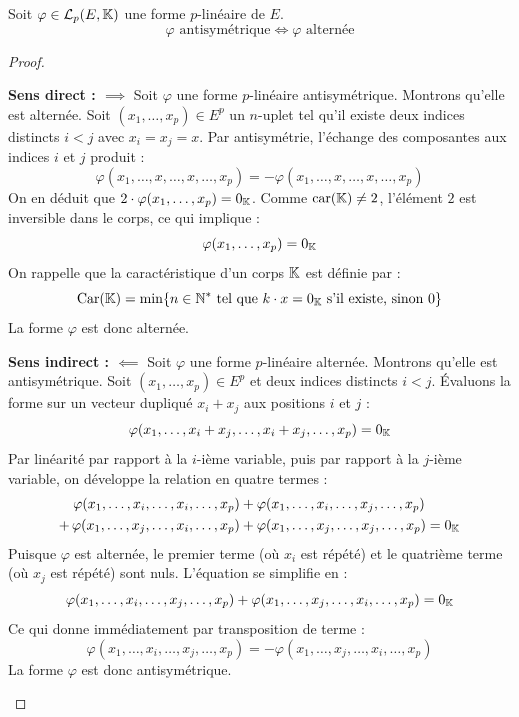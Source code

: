 \documentclass[12pt, a4paper]{report}
\begin{document}
\begin{property}
    Soit $\varphi \in \mathcal L_p(E,\mathbb{K})$ une forme $p$-linéaire de $E$.
    $$\varphi \text{ antisymétrique} \iff \varphi \text{ alternée}$$
\end{property}

\begin{proof}
    \begin{outline}
        \1 \textbf{Sens direct : $\implies$}
        \2 Soit $\varphi$ une forme $p$-linéaire antisymétrique. Montrons qu'elle est alternée.
        \2 Soit $(x_1,\dots,x_p) \in E^p$ un $n$-uplet tel qu'il existe deux indices distincts $i < j$ avec $x_i = x_j = x$.
        \2 Par antisymétrie, l'échange des composantes aux indices $i$ et $j$ produit :
        $$\varphi(x_1, \dots, x, \dots, x, \dots, x_p) = -\varphi(x_1, \dots, x, \dots, x, \dots, x_p)$$
        \2 On en déduit que $2 \cdot \varphi(x_1, \dots, x_p) = 0_{\mathbb{K}}$. Comme $\text{car}(\mathbb{K}) \neq 2$, l'élément $2$ est inversible dans le corps, ce qui implique :
        $$\varphi(x_1, \dots, x_p) = 0_{\mathbb{K}}$$
        On rappelle que la caractéristique d'un corps $\mathbb{K}$ est définie par :
        $$\mathrm{Car}(\mathbb{K}) = \min\{n \in \mathbb{N}^* \text{ tel que } k\cdot x = 0_{\mathbb{K}} \text{ s'il existe, sinon } 0\}$$
        \2 La forme $\varphi$ est donc alternée.

        \1 \textbf{Sens indirect : $\impliedby$}
        \2 Soit $\varphi$ une forme $p$-linéaire alternée. Montrons qu'elle est antisymétrique.
        \2 Soit $(x_1,\dots,x_p) \in E^p$ et deux indices distincts $i < j$. Évaluons la forme sur un vecteur dupliqué $x_i + x_j$ aux positions $i$ et $j$ :
        $$\varphi(x_1, \dots, x_i + x_j, \dots, x_i + x_j, \dots, x_p) = 0_{\mathbb{K}}$$
        \2 Par linéarité par rapport à la $i$-ième variable, puis par rapport à la $j$-ième variable, on développe la relation en quatre termes :
        \begin{align*}
            \varphi(x_1, \dots, x_i, \dots, x_i, \dots, x_p) &+ \varphi(x_1, \dots, x_i, \dots, x_j, \dots, x_p) \\
            +\, \varphi(x_1, \dots, x_j, \dots, x_i, \dots, x_p) &+ \varphi(x_1, \dots, x_j, \dots, x_j, \dots, x_p) = 0_{\mathbb{K}}
        \end{align*}
        \2 Puisque $\varphi$ est alternée, le premier terme (où $x_i$ est répété) et le quatrième terme (où $x_j$ est répété) sont nuls. L'équation se simplifie en :
        $$\varphi(x_1, \dots, x_i, \dots, x_j, \dots, x_p) + \varphi(x_1, \dots, x_j, \dots, x_i, \dots, x_p) = 0_{\mathbb{K}}$$
        \2 Ce qui donne immédiatement par transposition de terme :
        $$\varphi(x_1, \dots, x_i, \dots, x_j, \dots, x_p) = -\varphi(x_1, \dots, x_j, \dots, x_i, \dots, x_p)$$
        \2 La forme $\varphi$ est donc antisymétrique.
    \end{outline}
\end{proof}
\end{document}
